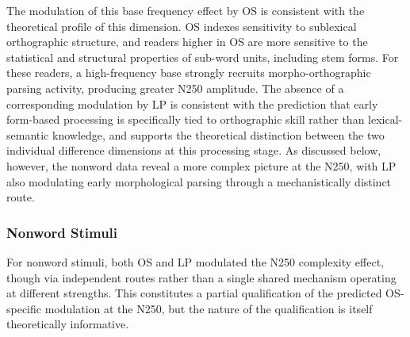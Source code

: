 \documentclass[utf8]{FrontiersinHarvard} %
\begin{document}
	The modulation of this base frequency effect by OS is consistent with the theoretical profile of this dimension. OS indexes sensitivity to sublexical orthographic structure, and readers higher in OS are more sensitive to the statistical and structural properties of sub-word units, including stem forms. For these readers, a high-frequency base strongly recruits morpho-orthographic parsing activity, producing greater N250 amplitude. The absence of a corresponding modulation by LP is consistent with the prediction that early form-based processing is specifically tied to orthographic skill rather than lexical-semantic knowledge, and supports the theoretical distinction between the two individual difference dimensions at this processing stage. As discussed below, however, the nonword data reveal a more complex picture at the N250, with LP also modulating early morphological parsing through a mechanistically distinct route.

	
	\subsubsection{Nonword Stimuli}
	
	For nonword stimuli, both OS and LP modulated the N250 complexity effect, though via independent routes rather than a single shared mechanism operating at different strengths. This constitutes a partial qualification of the predicted OS-specific modulation at the N250, but the nature of the qualification is itself theoretically informative.
	
\end{document}
